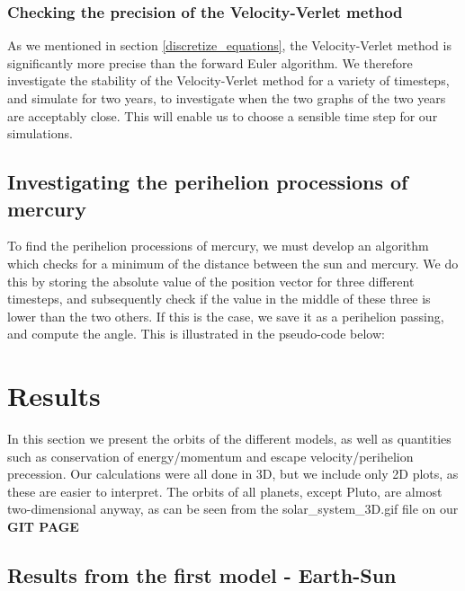 \documentclass[a4paper, 10pt]{article}
\begin{document}
\subsubsection{Checking the precision of the Velocity-Verlet method}
As we mentioned in section \ref{discretize_equations}, the Velocity-Verlet method is significantly more precise than the forward Euler algorithm. We therefore investigate the stability of the Velocity-Verlet method for a variety of timesteps, and simulate for two years, to investigate when the two graphs of the two years are acceptably close. This will enable us to choose a sensible time step for our simulations.
\subsection{Investigating the perihelion processions of mercury}
To find the perihelion processions of mercury, we must develop an algorithm which checks for a minimum of the distance between the sun and mercury. We do this by storing the absolute value of the position vector for three different timesteps, and subsequently check if the value in the middle of these three is lower than the two others. If this is the case, we save it as a perihelion passing, and compute the angle. This is illustrated in the pseudo-code below:


\section{Results}
In this section we present the orbits of the different models, as well as quantities such as conservation of energy/momentum and escape velocity/perihelion precession. Our calculations were all done in 3D, but we include only 2D plots, as these are easier to interpret. The orbits of all planets, except Pluto, are almost two-dimensional anyway, as can be seen from the solar\_system\_3D.gif file on our \textbf{GIT PAGE}
\subsection{Results from the first model - Earth-Sun}
\end{document}
